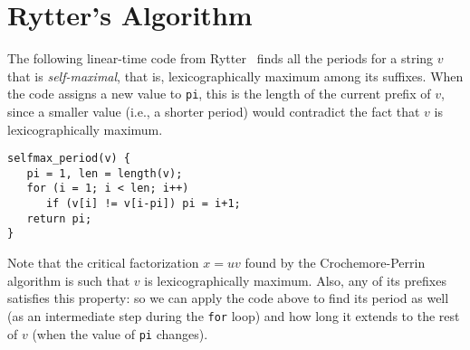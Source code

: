 \documentclass[12pt]{article}
\begin{document}
{\section{Rytter's Algorithm}
\label{app:rytter-algorithm}

The following linear-time code from Rytter~\cite{Rytter03a} finds all
the periods for a string $v$ that is \emph{self-maximal}, that is,
lexicographically maximum among its suffixes. When the code assigns a
new value to \texttt{pi}, this is the length of the current prefix of
$v$, since a smaller value (i.e., a shorter period) would
contradict the fact that $v$ is lexicographically maximum.

\medskip

{\small
\begin{verbatim}
selfmax_period(v) {
   pi = 1, len = length(v);
   for (i = 1; i < len; i++)
      if (v[i] != v[i-pi]) pi = i+1;
   return pi;
}
\end{verbatim}
}

\medskip

Note that the critical factorization $x=uv$ found by the
Crochemore-Perrin algorithm is such that $v$ is lexicographically
maximum. Also, any of its prefixes satisfies this property: so we can
apply the code above to find its period as well (as an intermediate
step during the \texttt{for} loop) and how long it extends to the rest
of $v$ (when the value of \texttt{pi} changes).
}
\end{document}

